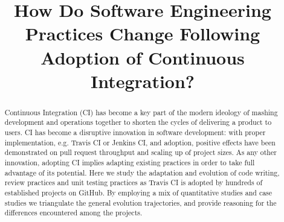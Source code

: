 \documentclass[conference]{IEEEtran}
\begin{document}
\title{How Do Software Engineering Practices
Change Following Adoption of Continuous Integration?}

\author
{
\and
{}
\and
{}
\and
{}
\and
{}
}
\maketitle
\begin{abstract}
Continuous Integration (CI) has become a key part of the modern ideology of mashing development and operations together to shorten the cycles of delivering a product to users. CI has become a disruptive innovation in software development: with proper implementation, e.g. Travis CI or Jenkins CI, and adoption, positive effects have been demonstrated on pull request throughput and scaling up of project sizes. As any other innovation, adopting CI implies adapting existing practices in order to take full advantage of its potential. Here we study the adaptation and evolution of code writing, review practices and unit testing practices as Travis CI is adopted by hundreds of established projects on GitHub. By employing a mix of quantitative studies and case studies we triangulate the general evolution trajectories, and provide reasoning for the differences encountered among the projects.
\end{abstract}

















\balance



\end{document}
